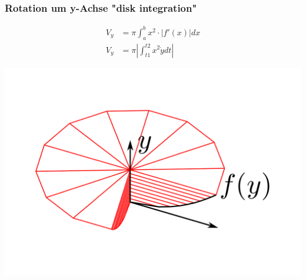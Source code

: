 \subsubsection{Rotation um y-Achse "disk integration"}
    \begin{minipage}{0.5\linewidth}
        \begin{align*}
             V_y &= \pi \int_a^b x^2 \cdot \left\lvert f'(x) \right\lvert dx \\
             V_y &= \pi \left\lvert \int_{t1}^{t2} x^2 \dot{y} dt  \right\lvert 
        \end{align*}
    \end{minipage}
    \begin{minipage}{0.49\linewidth}
         \includegraphics[width=\linewidth]{src/Mehrdimensionale-Funktionen_Integralrechnung/disk_integration.png}
    \end{minipage}

